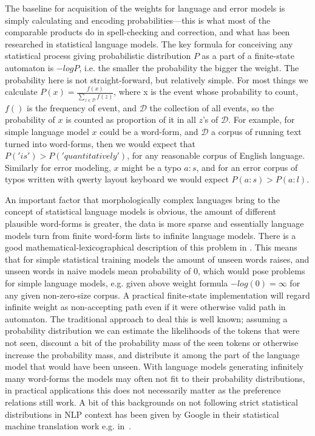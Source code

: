 \documentclass[officiallayout]{unihelcompling}
\begin{document}
The baseline for acquisition of the weights for language and error models is
simply calculating and encoding probabilities---this is what most of the
comparable products do in spell-checking and correction, and what has been
researched in statistical language models. The key formula for conceiving any
statistical process giving probabilistic distribution $P$ as a part of a
finite-state automaton is $-log P$, i.e. the smaller the probability the bigger
the weight. The probability here is not straight-forward, but relatively
simple. For most things we calculate $P(x) = \frac{f(x)}{\sum_{z \in
\mathcal{D}} f(z)}$, where x is the event whose probability to count, $f()$ is
the frequency of event, and $\mathcal{D}$ the collection of all events, so the
probability of $x$ is counted as proportion of it in all $z$'s of
$\mathcal{D}$. For example, for simple language model $x$ could be a word-form,
and $\mathcal{D}$ a corpus of running text turned into word-forms, then we
would expect that $P('is') > P('quantitatively')$, for any reasonable corpus of
English language. Similarly for error modeling, $x$ might be a typo $a:s$, and
for an error corpus of typos written with qwerty layout keyboard we would
expect $P(a:s) > P(a:l)$.

An important factor that morphologically complex languages bring to the
concept of statistical language models is obvious, the amount of different
plausible word-forms is greater, the data is more sparse and essentially
language models turn from finite word-form lists to infinite language models.
There is a good mathematical-lexicographical description of this problem in
\citep{kornai2002many}. This means that for simple statistical training models
the amount of unseen words raises, and unseen words in naive models mean
probability of $0$, which would pose problems for simple language models, e.g.
given above weight formula $-log(0) = \infty$ for any given non-zero-size
corpus. A practical finite-state implementation will regard infinite weight
as non-accepting path even if it were otherwise valid path in automaton. The
traditional approach to deal this is well known;
assuming a probability distribution we can estimate the likelihoods of the
tokens that were not seen, discount a bit of the probability mass of the seen
tokens or otherwise increase the probability mass, and distribute it among the
part of the language model that would have been unseen. With language models
generating infinitely many word-forms the models may often not fit to their
probability distributions, in practical applications this does not necessarily
matter as the preference relations still work. A bit of this backgrounds on not
following strict statistical distributions in NLP context has been given by
Google in their statistical machine translation work e.g. 
in~\citet{brants2007large}.
\end{document}
